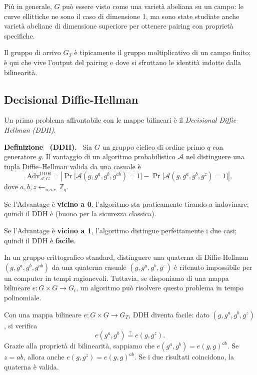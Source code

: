 \documentclass[a4paper, 11pt]{article}
\newenvironment{definition}[1][]{
  \par\noindent\textbf{Definizione%
  \if\relax\detokenize{#1}\relax\else\ (\textbf{#1})\fi.}\ }{}
\begin{document}
Più in generale, $G$ può essere visto come una varietà abeliana su un campo: le curve ellittiche ne sono il caso di dimensione 1, ma sono state studiate anche varietà abeliane di dimensione superiore per ottenere pairing con proprietà specifiche.

Il gruppo di arrivo $G_T$ è tipicamente il gruppo moltiplicativo di un campo finito; è qui che vive l'output del pairing e dove si sfruttano le identità indotte dalla bilinearità.

\subsection{Decisional Diffie-Hellman}

Un primo problema affrontabile con le mappe bilineari è il \textit{Decisional Diffie-Hellman (DDH)}.

\begin{definition}[DDH]
    Sia $G$ un gruppo ciclico di ordine primo $q$ con generatore $g$. Il vantaggio di un algoritmo probabilistico $\mathcal{A}$ nel distinguere una tupla Diffie–Hellman valida da una casuale è
    \[
    \text{Adv}^{\mathrm{DDH}}_{\mathcal{A},G}
    =
    \left|
      \Pr\!\big[\mathcal{A}(g, g^a, g^b, g^{ab}) = 1\big]
      - 
      \Pr\!\big[\mathcal{A}(g, g^a, g^b, g^{z}) = 1\big]
    \right|,
    \]
    dove $a,b,z \gets_{u.a.r.} \mathbb{Z}_q$.
\end{definition}

Se l'Advantage è \textbf{vicino a 0}, l'algoritmo sta praticamente tirando a indovinare; quindi il DDH è  (buono per la sicurezza classica).

Se l'Advantage è \textbf{vicino a 1}, l'algoritmo distingue perfettamente i due casi; quindi il DDH è \textbf{facile}.

In un gruppo crittografico standard, distinguere una quaterna di Diffie-Hellman $(g, g^a, g^b, g^{ab})$ da una quaterna casuale $(g, g^a, g^b, g^z)$ è ritenuto impossibile per un computer in tempi ragionevoli. Tuttavia, se disponiamo di una mappa bilineare $e:G \times G \to G_t$, un algoritmo può risolvere questo problema in tempo polinomiale.

Con una mappa bilineare $e:G\times G\to G_T$, DDH diventa facile: dato $(g, g^a, g^b, g^z)$, si verifica
\[
e(g^a, g^b) \overset{?}{=} e(g, g^z).
\]
Grazie alla proprietà di bilinearità, sappiamo che $e(g^a, g^b) = e(g,g)^{ab}$. Se $z = ab$, allora anche $e(g, g^z) = e(g,g)^{ab}$. Se i due risultati coincidono, la quaterna è valida.
\end{document}
